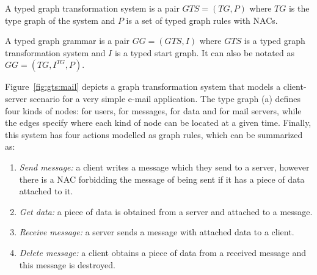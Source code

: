 \begin{definition} A typed graph transformation system is a pair $GTS = \left(TG,P\right)$ where $TG$ is the type graph of the system and $P$ is a set of typed graph rules with NACs.

  A typed graph grammar is a pair $GG = \left(GTS,I\right)$ where $GTS$ is a typed graph transformation system and $I$ is a typed start graph. It can also be notated as $GG = \left(TG, I^{TG},P \right)$.

\end{definition}

\begin{example}\label{ex:mail-grammar} Figure~\ref{fig:gts:mail} depicts a graph transformation system that models a client-server scenario for a very simple e-mail application. The type graph (a) defines four kinds of nodes: \faUser{} for users, \faEnvelope{} for messages, \faFileTextO{} for data and \faServer{} for mail servers, while the edges specify where each kind of node can be located at a given time. Finally, this system has four actions modelled as graph rules, which can be summarized as: 

\begin{enumerate}[label=(\alph*),start=2]
  \item \emph{Send message:} a client writes a message which they send to a server, however there is a NAC forbidding the message of being sent if it has a piece of data attached to it.
  \item \emph{Get data:} a piece of data is obtained from a server and attached to a message.
  \item \emph{Receive message:} a server sends a message with attached data to a client.
  \item \emph{Delete message:} a client obtains a piece of data from a received message and this message is destroyed.
\end{enumerate}


\end{example}
